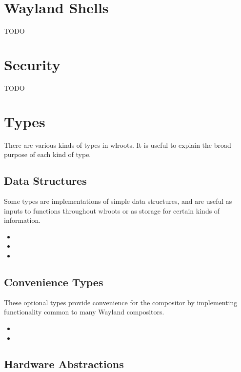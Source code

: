 \documentclass{article}
\begin{document}
\newpage
\section{Wayland Shells}\label{shells}

TODO

\newpage
\section{Security}\label{security}

TODO

\newpage
\section{Types}\label{types}

There are various kinds of types in wlroots. It is useful to explain the broad
purpose of each kind of type.

\subsection{Data Structures}\label{data structures}

Some types are implementations of simple data structures, and are useful as
inputs to functions throughout wlroots or as storage for certain kinds of
information.

\begin{itemize}
    \itemsep0em
    \item {}
    \item {}
    \item {}
\end{itemize}

\subsection{Convenience Types}\label{convenience types}

These optional types provide convenience for the compositor by implementing
functionality common to many Wayland compositors.

\begin{itemize}
    \itemsep0em
    \item {}
    \item {}
\end{itemize}

\subsection{Hardware Abstractions}\label{hardware abstractions}
\end{document}
